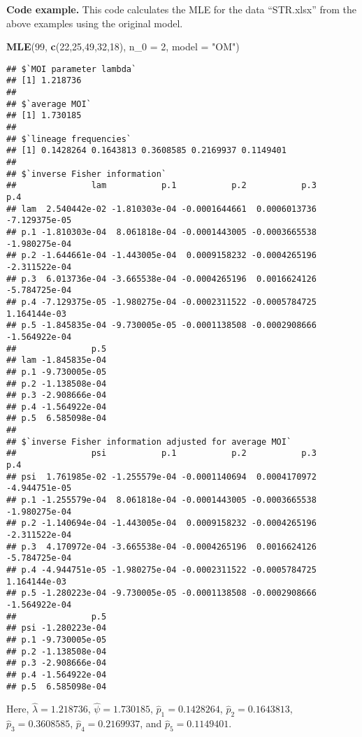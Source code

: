 \documentclass[
]{article}
\newenvironment{Shaded}{\begin{snugshade}}{\end{snugshade}}
\newcommand{\AttributeTok}[1]{\textcolor[rgb]{0.13,0.29,0.53}{#1}}
\newcommand{\DecValTok}[1]{\textcolor[rgb]{0.00,0.00,0.81}{#1}}
\newcommand{\FunctionTok}[1]{\textcolor[rgb]{0.13,0.29,0.53}{\textbf{#1}}}
\newcommand{\NormalTok}[1]{#1}
\newcommand{\StringTok}[1]{\textcolor[rgb]{0.31,0.60,0.02}{#1}}
\begin{document}
\textbf{Code example.} This code calculates the MLE for the data
``STR.xlsx'' from the above examples using the original model.

\begin{Shaded}
\begin{Highlighting}[]
\FunctionTok{MLE}\NormalTok{(}\DecValTok{99}\NormalTok{, }\FunctionTok{c}\NormalTok{(}\DecValTok{22}\NormalTok{,}\DecValTok{25}\NormalTok{,}\DecValTok{49}\NormalTok{,}\DecValTok{32}\NormalTok{,}\DecValTok{18}\NormalTok{), }\AttributeTok{n\_0 =} \DecValTok{2}\NormalTok{, }\AttributeTok{model =} \StringTok{"OM"}\NormalTok{)}
\end{Highlighting}
\end{Shaded}

\begin{verbatim}
## $`MOI parameter lambda`
## [1] 1.218736
## 
## $`average MOI`
## [1] 1.730185
## 
## $`lineage frequencies`
## [1] 0.1428264 0.1643813 0.3608585 0.2169937 0.1149401
## 
## $`inverse Fisher information`
##               lam           p.1           p.2           p.3           p.4
## lam  2.540442e-02 -1.810303e-04 -0.0001644661  0.0006013736 -7.129375e-05
## p.1 -1.810303e-04  8.061818e-04 -0.0001443005 -0.0003665538 -1.980275e-04
## p.2 -1.644661e-04 -1.443005e-04  0.0009158232 -0.0004265196 -2.311522e-04
## p.3  6.013736e-04 -3.665538e-04 -0.0004265196  0.0016624126 -5.784725e-04
## p.4 -7.129375e-05 -1.980275e-04 -0.0002311522 -0.0005784725  1.164144e-03
## p.5 -1.845835e-04 -9.730005e-05 -0.0001138508 -0.0002908666 -1.564922e-04
##               p.5
## lam -1.845835e-04
## p.1 -9.730005e-05
## p.2 -1.138508e-04
## p.3 -2.908666e-04
## p.4 -1.564922e-04
## p.5  6.585098e-04
## 
## $`inverse Fisher information adjusted for average MOI`
##               psi           p.1           p.2           p.3           p.4
## psi  1.761985e-02 -1.255579e-04 -0.0001140694  0.0004170972 -4.944751e-05
## p.1 -1.255579e-04  8.061818e-04 -0.0001443005 -0.0003665538 -1.980275e-04
## p.2 -1.140694e-04 -1.443005e-04  0.0009158232 -0.0004265196 -2.311522e-04
## p.3  4.170972e-04 -3.665538e-04 -0.0004265196  0.0016624126 -5.784725e-04
## p.4 -4.944751e-05 -1.980275e-04 -0.0002311522 -0.0005784725  1.164144e-03
## p.5 -1.280223e-04 -9.730005e-05 -0.0001138508 -0.0002908666 -1.564922e-04
##               p.5
## psi -1.280223e-04
## p.1 -9.730005e-05
## p.2 -1.138508e-04
## p.3 -2.908666e-04
## p.4 -1.564922e-04
## p.5  6.585098e-04
\end{verbatim}

Here, \(\hat \lambda=1.218736\), \(\hat \psi = 1.730185\),
\(\hat p_1=0.1428264\), \(\hat p_2=0.1643813\), \(\hat p_3=0.3608585\),
\(\hat p_4=0.2169937\), and \(\hat p_5=0.1149401\).
\end{document}
